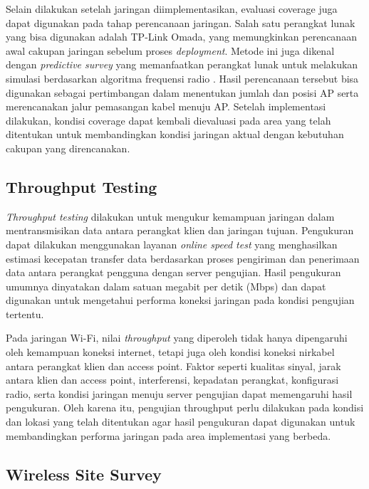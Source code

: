 Selain dilakukan setelah jaringan diimplementasikan, evaluasi coverage juga dapat digunakan pada tahap perencanaan jaringan. Salah satu perangkat lunak yang bisa digunakan adalah TP-Link Omada, yang memungkinkan perencanaan awal cakupan jaringan sebelum proses \textit{deployment}. Metode ini juga dikenal dengan \textit{predictive survey} yang memanfaatkan perangkat lunak untuk melakukan simulasi berdasarkan algoritma frequensi radio \parencite{CISCO_SITE_SURVEY}. Hasil perencanaan tersebut bisa digunakan sebagai pertimbangan dalam menentukan jumlah dan posisi AP serta merencanakan jalur pemasangan kabel menuju AP. Setelah implementasi dilakukan, kondisi coverage dapat kembali dievaluasi pada area yang telah ditentukan untuk membandingkan kondisi jaringan aktual dengan kebutuhan cakupan yang direncanakan.

\subsection{Throughput Testing}

\textit{Throughput testing} dilakukan untuk mengukur kemampuan jaringan dalam mentransmisikan data antara perangkat klien dan jaringan tujuan. Pengukuran dapat dilakukan menggunakan layanan \textit{online speed test} yang menghasilkan estimasi kecepatan transfer data berdasarkan proses pengiriman dan penerimaan data antara perangkat pengguna dengan server pengujian. Hasil pengukuran umumnya dinyatakan dalam satuan megabit per detik (Mbps) dan dapat digunakan untuk mengetahui performa koneksi jaringan pada kondisi pengujian tertentu.

Pada jaringan Wi-Fi, nilai \textit{throughput} yang diperoleh tidak hanya dipengaruhi oleh kemampuan koneksi internet, tetapi juga oleh kondisi koneksi nirkabel antara perangkat klien dan access point. Faktor seperti kualitas sinyal, jarak antara klien dan access point, interferensi, kepadatan perangkat, konfigurasi radio, serta kondisi jaringan menuju server pengujian dapat memengaruhi hasil pengukuran. Oleh karena itu, pengujian throughput perlu dilakukan pada kondisi dan lokasi yang telah ditentukan agar hasil pengukuran dapat digunakan untuk membandingkan performa jaringan pada area implementasi yang berbeda.

\subsection{Wireless Site Survey}

